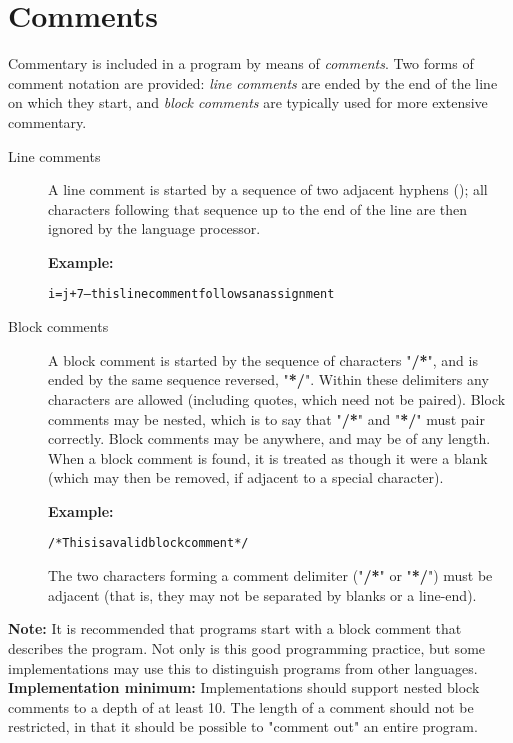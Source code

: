 \section{Comments}\label{refcomment}
\index{,}
\index{,}
\index{,}
 Commentary is included in a \nr{} program by means of
\emph{comments}.  Two forms of comment notation are provided:
\emph{line comments} are ended by the end of the line on which they
start, and \emph{block comments} are typically used for more extensive
commentary.
\begin{description}
\item[Line comments]\label{reflineco}

A line comment is started by a sequence of two adjacent hyphens
(\doublehyphen{}); all characters following that sequence up to the
end of the line are then ignored by the \nr{} language processor.
 
\textbf{Example:}
\begin{alltt}
i=j+7  -- this line comment follows an assignment
\end{alltt}
\item[Block comments]\label{refblockco}
 A block comment is started by the sequence of characters
"\textbf{/*}", and is ended by the same sequence reversed,
"\textbf{*/}".
Within these delimiters any characters are allowed (including quotes,
which need not be paired).
Block comments may be nested, which is to say that
"\textbf{/*}" and "\textbf{*/}" must pair correctly.
Block comments may be anywhere, and may be of any length.
When a block comment is found, it is treated as though it were a blank
(which may then be removed, if adjacent to a special character).
 
\textbf{Example:}
\begin{alltt}
/* This is a valid block comment */
\end{alltt}
The two characters forming a comment delimiter
("\textbf{/*}" or "\textbf{*/}") must be adjacent
(that is, they may not be separated by blanks or a line-end).
\end{description}
\begin{shaded}\noindent
\textbf{Note: }It is recommended that \nr{} programs start with a block comment
that describes the program.
Not only is this good programming practice, but some implementations may
use this to distinguish \nr{} programs from other languages.
 \textbf{Implementation minimum:} Implementations should support
nested block comments to a depth of at least 10.
The length of a comment should not be restricted, in that it should be
possible to "comment out" an entire program.
\end{shaded}\indent
